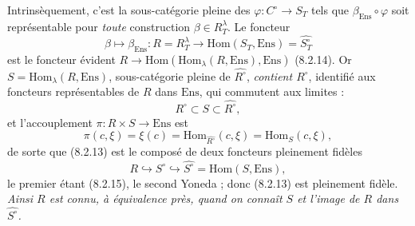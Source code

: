 \documentclass[11pt,a4paper]{article}
\begin{document}
Intrinsèquement, c'est la sous-catégorie pleine des $\varphi : C^{\circ} \to
S_{T}$ tels que $\beta_{\mathrm{Ens}} \circ \varphi$ soit représentable pour
\emph{toute} construction $\beta \in R^{\lambda}_{T}$. Le foncteur
\begin{equation}
\beta \longmapsto \beta_{\mathrm{Ens}} : R = R^{\lambda}_{T} \longrightarrow
\mathrm{Hom}(S_{T}, \mathrm{Ens}) = \widehat{S^{\circ}_{T}} \tag{8.2.13}
\end{equation}
est le foncteur évident $R \to \mathrm{Hom}(\mathrm{Hom}_{\lambda}(R,
\mathrm{Ens}), \mathrm{Ens})$ (8.2.14). Or $S = \mathrm{Hom}_{\lambda}(R,
\mathrm{Ens})$, sous-catégorie pleine de $\widehat{R^{\circ}}$, \emph{contient
$R^{\circ}$}, identifié aux foncteurs représentables de $R$ dans $\mathrm{Ens}$,
qui commutent aux limites :
\begin{equation}
R^{\circ} \subset S \subset \widehat{R^{\circ}}, \tag{8.2.15}
\end{equation}
et l'accouplement $\pi : R \times S \to \mathrm{Ens}$ est
\begin{equation}
\pi(c, \xi) = \xi(c) = \mathrm{Hom}_{\widehat{R^{\circ}}}(c, \xi) =
\mathrm{Hom}_{S}(c, \xi), \tag{8.2.16}
\end{equation}
de sorte que (8.2.13) est le composé de deux foncteurs pleinement fidèles
\begin{equation}
R \hookrightarrow S^{\circ} \hookrightarrow
\widehat{S^{\circ}} = \mathrm{Hom}(S, \mathrm{Ens}), \tag{8.2.17}
\end{equation}
le premier étant (8.2.15), le second Yoneda ; donc (8.2.13) est pleinement
fidèle. \emph{Ainsi $R$ est connu, à équivalence près, quand on connaît $S$
et l'image de $R$ dans $\widehat{S^{\circ}}$.}
\end{document}
